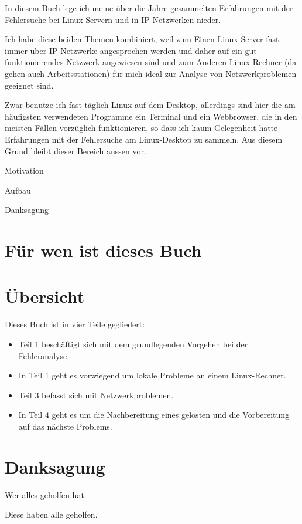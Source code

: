 \begin{normaltext}
  In diesem Buch lege ich meine über die Jahre gesammelten Erfahrungen mit
  der Fehlersuche bei Linux-Servern und in IP-Netzwerken nieder.

  Ich habe diese beiden Themen kombiniert, weil zum Einen Linux-Server fast
  immer über IP-Netzwerke angesprochen werden und daher auf ein gut
  funktionierendes Netzwerk angewiesen sind und zum Anderen Linux-Rechner
  (da gehen auch Arbeitsstationen) für mich ideal zur Analyse von
  Netzwerkproblemen geeignet sind.

  Zwar benutze ich fast täglich Linux auf dem Desktop, allerdings sind hier
  die am häufigsten verwendeten Programme ein Terminal und ein Webbrowser, die
  in den meisten Fällen vorzüglich funktionieren, so dass ich kaum Gelegenheit
  hatte Erfahrungen mit der Fehlersuche am Linux-Desktop zu sammeln. Aus
  diesem Grund bleibt dieser Bereich aussen vor.
\end{normaltext}
\begin{notes}
\item Motivation
\item Aufbau
\item Danksagung
\end{notes}

\section*{Für wen ist dieses Buch}
\label{sec:fuerwen}

\begin{normaltext}
\end{normaltext}

\section*{Übersicht}
\label{sec:ubersicht}

\begin{normaltext}
  Dieses Buch ist in vier Teile gegliedert:
  \begin{itemize}
  \item Teil 1 beschäftigt sich mit dem grundlegenden Vorgehen bei der
    Fehleranalyse.
  \item In Teil 1 geht es vorwiegend um lokale Probleme an einem
    Linux-Rechner.
  \item Teil 3 befasst sich mit Netzwerkproblemen.
  \item In Teil 4 geht es um die Nachbereitung eines gelösten und die
    Vorbereitung auf das nächste Problems.
  \end{itemize}
\end{normaltext}

\section*{Danksagung}
\label{sec:problemstellung}

\begin{abstractsec}
  Wer alles geholfen hat.
\end{abstractsec}
\begin{normaltext}
  Diese haben alle geholfen.
\end{normaltext}

